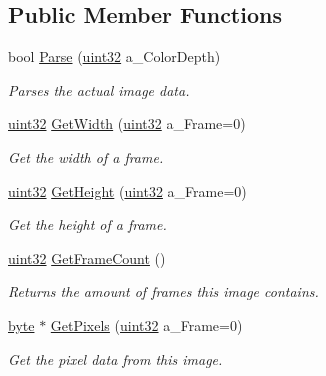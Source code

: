 \subsection*{Public Member Functions}
\begin{DoxyCompactItemize}
\item 
bool \hyperlink{classtil_1_1_image_p_n_g_aa3b8117c35f399d958870e3ecba9e1b7}{Parse} (\hyperlink{namespacetil_a20db61688ed403d11f057a508d87e54c}{uint32} a\_\-ColorDepth)
\begin{DoxyCompactList}\small\item\em Parses the actual image data. \item\end{DoxyCompactList}\item 
\hyperlink{namespacetil_a20db61688ed403d11f057a508d87e54c}{uint32} \hyperlink{classtil_1_1_image_p_n_g_a25dffae4745e88dab32c8dc7cdf3c591}{GetWidth} (\hyperlink{namespacetil_a20db61688ed403d11f057a508d87e54c}{uint32} a\_\-Frame=0)
\begin{DoxyCompactList}\small\item\em Get the width of a frame. \item\end{DoxyCompactList}\item 
\hyperlink{namespacetil_a20db61688ed403d11f057a508d87e54c}{uint32} \hyperlink{classtil_1_1_image_p_n_g_a64dff92207203a4673290a0ed3634538}{GetHeight} (\hyperlink{namespacetil_a20db61688ed403d11f057a508d87e54c}{uint32} a\_\-Frame=0)
\begin{DoxyCompactList}\small\item\em Get the height of a frame. \item\end{DoxyCompactList}\item 
\hyperlink{namespacetil_a20db61688ed403d11f057a508d87e54c}{uint32} \hyperlink{classtil_1_1_image_p_n_g_ade57a800697abe8f024a305e236b3471}{GetFrameCount} ()
\begin{DoxyCompactList}\small\item\em Returns the amount of frames this image contains. \item\end{DoxyCompactList}\item 
\hyperlink{namespacetil_a5f3ec10aca1a788b495a0bd3787bc2dc}{byte} $\ast$ \hyperlink{classtil_1_1_image_p_n_g_a2dc5b02cc0e64d2cf44202122c3e7e86}{GetPixels} (\hyperlink{namespacetil_a20db61688ed403d11f057a508d87e54c}{uint32} a\_\-Frame=0)
\begin{DoxyCompactList}\small\item\em Get the pixel data from this image. \item\end{DoxyCompactList}\end{DoxyCompactItemize}
